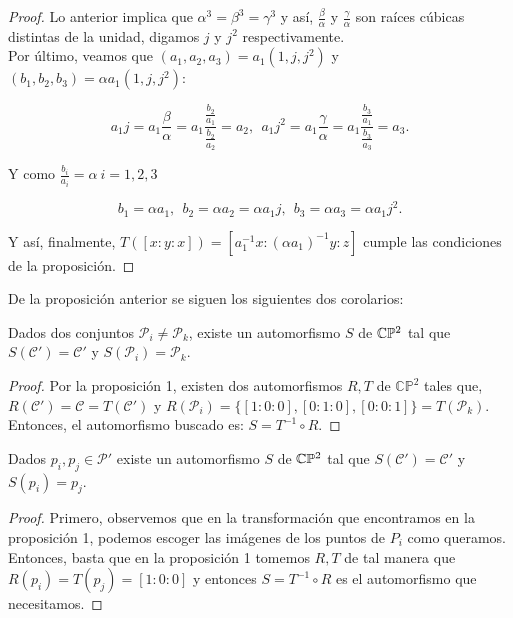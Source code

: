 \begin{proof}
\noindent Lo anterior implica que $\alpha^{3} = \beta^{3} = \gamma^{3}$ y así, $\frac{\beta}{\alpha}$ y $\frac{\gamma}{\alpha}$ son raíces cúbicas distintas de la unidad, digamos $j$ y $j^{2}$ respectivamente.
\\

Por último, veamos que $(a_{1},a_{2},a_{3}) = a_{1}(1,j,j^{2})$ y $(b_{1},b_{2},b_{3}) = \alpha a_{1}(1,j,j^{2})$:

$$a_{1}j = a_{1}\frac{\beta}{\alpha}=a_{1}\frac{\frac{b_{2}}{a_{1}}}{\frac{b_{2}}{a_{2}}} = a_{2},\ \ a_{1}j^{2} = a_{1}\frac{\gamma}{\alpha} = a_{1}\frac{\frac{b_{3}}{a_{1}}}{\frac{b_{3}}{a_{3}}} = a_{3}.$$

\noindent Y como $\frac{b_{i}}{a_{i}} = \alpha \ i=1,2,3$

$$b_{1} = \alpha a_{1},\ \ b_{2} = \alpha a_{2} = \alpha a_{1}j,\ \ b_{3} = \alpha a_{3} = \alpha a_{1}j^{2}.$$ 

\noindent Y así, finalmente, $T([x:y:x]) = [a_{1}^{-1}x : (\alpha a_{1})^{-1}y : z ]$ cumple las condiciones de la proposición.

\end{proof}

De la proposición anterior se siguen los siguientes dos corolarios:

\begin{Corolario}
\label{Coro1Prop1}
  Dados dos conjuntos $\mathcal{P}_{i} \neq \mathcal{P}_{k}$, existe un automorfismo $S$ de $\mathbb{C}\mathbb{P}^2$ tal que $S(\mathcal{C'}) = \mathcal{C'}$ y $S(\mathcal{P}_{i}) = \mathcal{P}_{k}$.

\end{Corolario}

\begin{proof}

Por la proposición 1, existen dos automorfismos $R,T$ de $\mathbb{CP^{\mathrm{2}}}$ tales que, $R(\mathcal{C'}) = \mathcal{C} = T(\mathcal{C'})$ y $ R(\mathcal{P}_{i}) = \{ [1:0:0],[0:1:0],[0:0:1] \} = T(\mathcal{P}_{k})$. Entonces, el automorfismo buscado es: $S = T^{-1} \circ R$.

\end{proof}

\begin{Corolario}
\label{Coro2Prop1}
Dados $p_{i}, p_{j} \in \mathcal{P'}$ existe un automorfismo $S$ de $\mathbb{C}\mathbb{P}^2$ tal que $S(\mathcal{C'}) = \mathcal{C'}$ y $S(p_{i}) = p_{j}$. 

\end{Corolario}

\begin{proof}

Primero, observemos que en la transformación que encontramos en la proposición 1, podemos escoger las imágenes de los puntos de $P_{i}$ como queramos. Entonces, basta que en la proposición 1 tomemos $R, T $ de tal manera que $R(p_{i}) = T(p_{j}) = [1:0:0]$ y entonces $S = T^{-1} \circ R$ es el automorfismo que necesitamos.

\end{proof}


